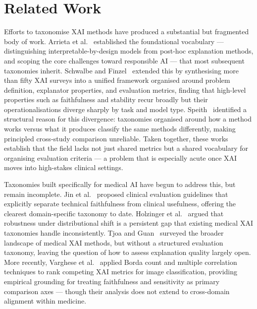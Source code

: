 
\section{Related Work}

Efforts to taxonomise XAI methods have produced a substantial but fragmented
body of work. Arrieta et al.~\cite{Arrieta2020XAI} established the foundational
vocabulary --- distinguishing interpretable-by-design models from post-hoc
explanation methods, and scoping the core challenges toward responsible AI ---
that most subsequent taxonomies inherit. Schwalbe and
Finzel~\cite{schwalbe2024comprehensive} extended this by synthesising more than
fifty XAI surveys into a unified framework organised around problem definition,
explanator properties, and evaluation metrics, finding that high-level properties
such as faithfulness and stability recur broadly but their operationalisations
diverge sharply by task and model type. Speith~\cite{speith2022review} identified
a structural reason for this divergence: taxonomies organised around how a method
works versus what it produces classify the same methods differently, making
principled cross-study comparison unreliable. Taken together, these works
establish that the field lacks not just shared metrics but a shared vocabulary
for organising evaluation criteria --- a problem that is especially acute once
XAI moves into high-stakes clinical settings.

Taxonomies built specifically for medical AI have begun to address this, but
remain incomplete. Jin et al.~\cite{jin2023guidelines} proposed clinical
evaluation guidelines that explicitly separate technical faithfulness from
clinical usefulness, offering the clearest domain-specific taxonomy to date.
Holzinger et al.~\cite{holzinger2022information} argued that
robustness under distributional shift is a persistent gap that existing medical
XAI taxonomies handle inconsistently. Tjoa and
Guan~\cite{Tjoa2021MedicalXAI} surveyed the broader landscape of medical XAI
methods, but without a structured evaluation taxonomy, leaving the question of
how to assess explanation quality largely open. More recently,
Varghese et al.~\cite{Varghese2025OnDE} applied Borda count and multiple
correlation techniques to rank competing XAI metrics for image classification,
providing empirical grounding for treating faithfulness and sensitivity as
primary comparison axes --- though their analysis does not extend to
cross-domain alignment within medicine.

